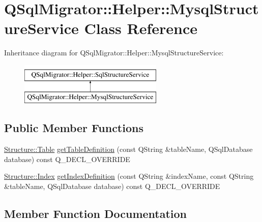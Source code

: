 \hypertarget{class_q_sql_migrator_1_1_helper_1_1_mysql_structure_service}{}\section{Q\+Sql\+Migrator\+:\+:Helper\+:\+:Mysql\+Structure\+Service Class Reference}
\label{class_q_sql_migrator_1_1_helper_1_1_mysql_structure_service}
Inheritance diagram for Q\+Sql\+Migrator\+:\+:Helper\+:\+:Mysql\+Structure\+Service\+:\begin{figure}[H]
\begin{center}
\leavevmode
\includegraphics[height=2.000000cm]{class_q_sql_migrator_1_1_helper_1_1_mysql_structure_service}
\end{center}
\end{figure}
\subsection*{Public Member Functions}
\begin{DoxyCompactItemize}
\item 
\hyperlink{class_q_sql_migrator_1_1_structure_1_1_table}{Structure\+::\+Table} \hyperlink{class_q_sql_migrator_1_1_helper_1_1_mysql_structure_service_a67d203e233e158e2a57bfe1b417c549f}{get\+Table\+Definition} (const Q\+String \&table\+Name, Q\+Sql\+Database database) const Q\+\_\+\+D\+E\+C\+L\+\_\+\+O\+V\+E\+R\+R\+I\+DE
\item 
\hyperlink{class_q_sql_migrator_1_1_structure_1_1_index}{Structure\+::\+Index} \hyperlink{class_q_sql_migrator_1_1_helper_1_1_mysql_structure_service_a726f1171c0cc1eb76638725b0a06ba78}{get\+Index\+Definition} (const Q\+String \&index\+Name, const Q\+String \&table\+Name, Q\+Sql\+Database database) const Q\+\_\+\+D\+E\+C\+L\+\_\+\+O\+V\+E\+R\+R\+I\+DE
\end{DoxyCompactItemize}


\subsection{Member Function Documentation}
\mbox{\label{class_q_sql_migrator_1_1_helper_1_1_mysql_structure_service_a726f1171c0cc1eb76638725b0a06ba78}} 
